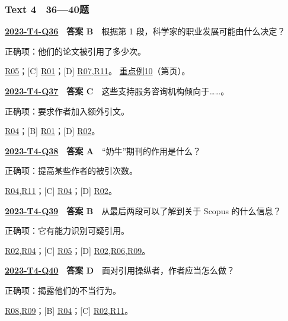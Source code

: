 \documentclass[11pt,a4paper]{article}
\begin{document}
\subsubsection{Text 4　36—40题}
\label{idx-2023-T4-Q36}
\noindent\textbf{\href{https://zj139.github.io/math-notes/english/992b4ff31df156ca5bf5dfbd/\#q36}{2023-T4-Q36}　答案 B}　根据第 1 段，科学家的职业发展可能由什么决定？\par\nopagebreak
\noindent 正确项：他们的论文被引用了多少次。\par\nopagebreak
\noindent [A] \hyperref[cat-R05]{R05}；[C] \hyperref[cat-R01]{R01}；[D] \hyperref[cat-R07]{R07},\hyperref[cat-R11]{R11}。
\hyperref[case-2023-T4-Q36]{重点例10}（第\pageref{case-2023-T4-Q36}页）。
\par\smallskip
{}\label{idx-2023-T4-Q37}
\noindent\textbf{\href{https://zj139.github.io/math-notes/english/992b4ff31df156ca5bf5dfbd/\#q37}{2023-T4-Q37}　答案 C}　这些支持服务咨询机构倾向于……。\par\nopagebreak
\noindent 正确项：要求作者加入额外引文。\par\nopagebreak
\noindent [A] \hyperref[cat-R04]{R04}；[B] \hyperref[cat-R01]{R01}；[D] \hyperref[cat-R02]{R02}。
\par\smallskip
{}\label{idx-2023-T4-Q38}
\noindent\textbf{\href{https://zj139.github.io/math-notes/english/992b4ff31df156ca5bf5dfbd/\#q38}{2023-T4-Q38}　答案 A}　“奶牛”期刊的作用是什么？\par\nopagebreak
\noindent 正确项：提高某些作者的被引次数。\par\nopagebreak
\noindent [B] \hyperref[cat-R04]{R04},\hyperref[cat-R11]{R11}；[C] \hyperref[cat-R04]{R04}；[D] \hyperref[cat-R02]{R02}。
\par\smallskip
{}\label{idx-2023-T4-Q39}
\noindent\textbf{\href{https://zj139.github.io/math-notes/english/992b4ff31df156ca5bf5dfbd/\#q39}{2023-T4-Q39}　答案 B}　从最后两段可以了解到关于 Scopus 的什么信息？\par\nopagebreak
\noindent 正确项：它有能力识别可疑引用。\par\nopagebreak
\noindent [A] \hyperref[cat-R02]{R02},\hyperref[cat-R04]{R04}；[C] \hyperref[cat-R05]{R05}；[D] \hyperref[cat-R02]{R02},\hyperref[cat-R06]{R06},\hyperref[cat-R09]{R09}。
\par\smallskip
{}\label{idx-2023-T4-Q40}
\noindent\textbf{\href{https://zj139.github.io/math-notes/english/992b4ff31df156ca5bf5dfbd/\#q40}{2023-T4-Q40}　答案 D}　面对引用操纵者，作者应当怎么做？\par\nopagebreak
\noindent 正确项：揭露他们的不当行为。\par\nopagebreak
\noindent [A] \hyperref[cat-R08]{R08},\hyperref[cat-R09]{R09}；[B] \hyperref[cat-R04]{R04}；[C] \hyperref[cat-R02]{R02},\hyperref[cat-R11]{R11}。
\par\smallskip
\clearpage\setlength{\parskip}{1pt}
\end{document}

